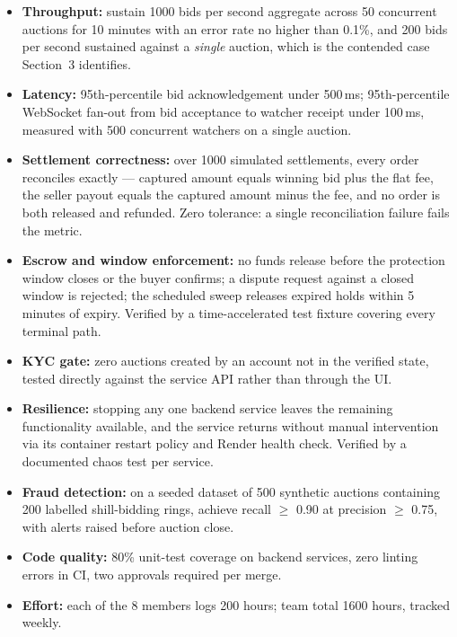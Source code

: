 \documentclass[11pt, a4paper]{article}
\begin{document}
\begin{itemize}
    \item \textbf{Throughput:} sustain 1000 bids per second aggregate across 50 concurrent
          auctions for 10 minutes with an error rate no higher than 0.1\%, and 200 bids per
          second sustained against a \emph{single} auction, which is the contended case
          Section~3 identifies.
    \item \textbf{Latency:} 95th-percentile bid acknowledgement under 500\,ms; 95th-percentile
          WebSocket fan-out from bid acceptance to watcher receipt under 100\,ms, measured
          with 500 concurrent watchers on a single auction.
    \item \textbf{Settlement correctness:} over 1000 simulated settlements, every order
          reconciles exactly --- captured amount equals winning bid plus the flat fee, the
          seller payout equals the captured amount minus the fee, and no order is both
          released and refunded. Zero tolerance: a single reconciliation failure fails the
          metric.
    \item \textbf{Escrow and window enforcement:} no funds release before the protection
          window closes or the buyer confirms; a dispute request against a closed window is
          rejected; the scheduled sweep releases expired holds within 5 minutes of expiry.
          Verified by a time-accelerated test fixture covering every terminal path.
    \item \textbf{KYC gate:} zero auctions created by an account not in the verified state,
          tested directly against the service API rather than through the UI.
    \item \textbf{Resilience:} stopping any one backend service leaves the remaining
          functionality available, and the service returns without manual intervention via
          its container restart policy and Render health check. Verified by a documented
          chaos test per service.
    \item \textbf{Fraud detection:} on a seeded dataset of 500 synthetic auctions containing
          200 labelled shill-bidding rings, achieve recall $\geq$ 0.90 at precision
          $\geq$ 0.75, with alerts raised before auction close.
    \item \textbf{Code quality:} 80\% unit-test coverage on backend services, zero linting
          errors in CI, two approvals required per merge.
    \item \textbf{Effort:} each of the 8 members logs 200 hours; team total 1600 hours,
          tracked weekly.
\end{itemize}
\end{document}
